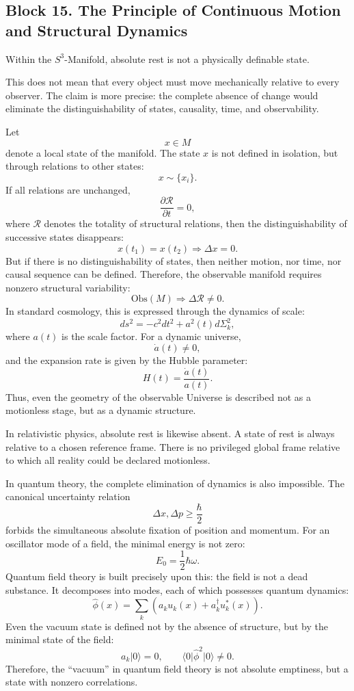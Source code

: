 \documentclass[12pt,a4paper]{article}
\theoremstyle{definition}
\begin{document}
\subsection{Block 15. The Principle of Continuous Motion and Structural Dynamics}
Within the \(S^3\)-Manifold, absolute rest is not a physically definable state.

This does not mean that every object must move mechanically relative to every observer. The claim is more precise: the complete absence of change would eliminate the distinguishability of states, causality, time, and observability.

Let
\[
x\in M
\]
denote a local state of the manifold. The state \(x\) is not defined in isolation, but through relations to other states:
\[
x\sim\{x_i\}.
\]
If all relations are unchanged,
\[
\frac{\partial \mathcal R}{\partial t}=0,
\]
where \(\mathcal R\) denotes the totality of structural relations, then the distinguishability of successive states disappears:
\[
x(t_1)=x(t_2)\Rightarrow \Delta x=0.
\]
But if there is no distinguishability of states, then neither motion, nor time, nor causal sequence can be defined. Therefore, the observable manifold requires nonzero structural variability:
\[
\mathrm{Obs}(M)\Rightarrow \Delta \mathcal R\neq 0.
\]
In standard cosmology, this is expressed through the dynamics of scale:
\[
ds^2=-c^2dt^2+a^2(t)d\Sigma_k^2,
\]
where $a(t)$ is the scale factor. For a dynamic universe,
\[
\dot a(t)\neq 0,
\]
and the expansion rate is given by the Hubble parameter:
\[
H(t)=\frac{\dot a(t)}{a(t)}.
\]
Thus, even the geometry of the observable Universe is described not as a motionless stage, but as a dynamic structure.

In relativistic physics, absolute rest is likewise absent. A state of rest is always relative to a chosen reference frame. There is no privileged global frame relative to which all reality could be declared motionless.

In quantum theory, the complete elimination of dynamics is also impossible. The canonical uncertainty relation
\[
\Delta x,\Delta p\geq \frac{\hbar}{2}
\]
forbids the simultaneous absolute fixation of position and momentum. For an oscillator mode of a field, the minimal energy is not zero:
\[
E_0=\frac{1}{2}\hbar\omega.
\]
Quantum field theory is built precisely upon this: the field is not a dead substance. It decomposes into modes, each of which possesses quantum dynamics:
\[
\hat\phi(x)=
\sum_k
\left(
a_k u_k(x)+a_k^\dagger u_k^*(x)
\right).
\]
Even the vacuum state is defined not by the absence of structure, but by the minimal state of the field:
\[
a_k|0\rangle=0,
\qquad
\langle 0|\hat\phi^2|0\rangle\neq 0.
\]
Therefore, the ``vacuum'' in quantum field theory is not absolute emptiness, but a state with nonzero correlations.
\end{document}
